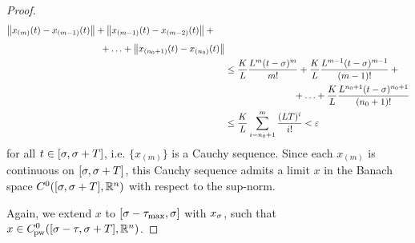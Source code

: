 \begin{proof}
\begin{align*}
\begin{multlined}[t][0.55\displaywidth]
                \nnorm*{x_{(m)}(t)-x_{(m-1)}(t)} + \nnorm*{x_{(m-1)}(t)-x_{(m-2)}(t)} + {}\\[0.5em]
                +\ldots+\nnorm*{x_{(n_0+1)}(t)-x_{(n_0)}(t)}
            \end{multlined}\\
            &\leq \!\begin{multlined}[t][0.6\displaywidth]
                \frac{K}{L}\frac{L^m (t-\tzero)^m}{m!} + \frac{K}{L}\frac{L^{m-1} (t-\tzero)^{m-1}}{(m-1)!} + {}\\
                +\ldots+\frac{K}{L}\frac{L^{n_0+1} (t-\tzero)^{n_0+1}}{(n_0+1)!}
            \end{multlined}\\
            &\leq \frac{K}{L}\sum_{i=n_0+1}^m \frac{(LT)^i}{i!} < \varepsilon
        \end{align*}
        for all $t\in [\sigma,\sigma+T]$, i.e. $\{x_{(m)}\}$ is a Cauchy sequence.
        Since each $x_{(m)}$ is continuous on $[\sigma,\sigma+T]$, this Cauchy sequence admits a limit $x$ in the Banach space $\Cn[0]{\compactum{\tzero}{\tzero+T}}{\R^n}$ with respect to the sup-norm.

        Again, we extend $x$ to $[\sigma-\tau_{\max},\sigma]$ with $x_\sigma$, such that $x\in\Cnpw[0]{\compactum{\tzero-\tau}{\tzero+T}}{\R^n}$.


\end{proof}

